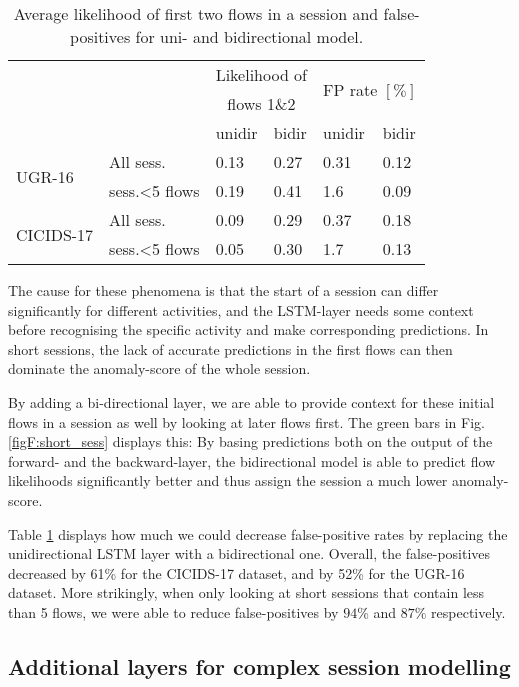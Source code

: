 \begin{table}[ht]
\centering
\begin{tabular}{l|l|l|l|l|l}
& & \multicolumn{2}{c|}{Likelihood of}&\multicolumn{2}{c}{\multirow{2}{*}{FP rate $[\%]$}}\\
& & \multicolumn{2}{c|}{flows 1\&2} &\multicolumn{2}{c}{} \\
&& unidir & bidir& unidir& bidir\\  \hline \hline
\multirow{2}{*}{UGR-16}&All sess.& 0.13&0.27 &0.31 & 0.12\\  \cline{2-6}
&sess.<5 flows& 0.19 & 0.41 & 1.6& 0.09\\  \hline \hline
\multirow{2}{*}{CICIDS-17}&All sess.& 0.09& 0.29& 0.37& 0.18\\  \cline{2-6}
&sess.<5 flows& 0.05 & 0.30 & 1.7& 0.13\\  \hline
\end{tabular}
\caption{Average likelihood of first two flows in a session and false-positives for uni- and bidirectional model.}\label{tabF:bidir}
\end{table}
The cause for these phenomena is that the start of a session can differ significantly for different activities, and the LSTM-layer needs some context before recognising the specific activity and make corresponding predictions. In short sessions, the lack of accurate predictions in the first flows can then dominate the anomaly-score of the whole session.

By adding a bi-directional layer, we are able to provide context for these initial flows in a session as well by looking at later flows first. The green bars in Fig. \ref{figF:short_sess} displays this: By basing predictions both on the output of the forward- and the backward-layer, the bidirectional model is able to predict flow likelihoods significantly better and thus assign the session a much lower anomaly-score.




Table \ref{tabF:bidir} displays how much we could decrease false-positive rates by replacing the unidirectional LSTM layer with a bidirectional one. Overall, the false-positives decreased by 61\% for the CICIDS-17 dataset, and by 52\% for the UGR-16 dataset. More strikingly, when only looking at short sessions that contain less than 5 flows, we were able to reduce false-positives by $94\%$ and $87\%$ respectively.


\subsection{Additional layers for complex session modelling}\label{SecF:depth}



